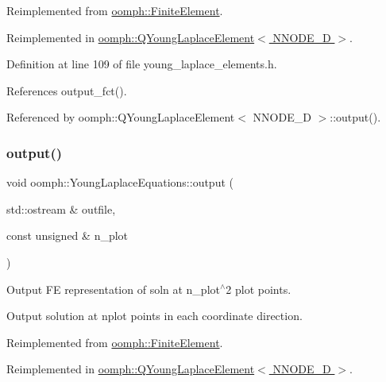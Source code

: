 Reimplemented from \hyperlink{classoomph_1_1FiniteElement_a2ad98a3d2ef4999f1bef62c0ff13f2a7}{oomph\+::\+Finite\+Element}.



Reimplemented in \hyperlink{classoomph_1_1QYoungLaplaceElement_acd3dd1655fe2b9fd060a15ab9116eeae}{oomph\+::\+Q\+Young\+Laplace\+Element$<$ N\+N\+O\+D\+E\+\_\+D $>$}.



Definition at line 109 of file young\+\_\+laplace\+\_\+elements.\+h.



References output\+\_\+fct().



Referenced by oomph\+::\+Q\+Young\+Laplace\+Element$<$ N\+N\+O\+D\+E\+\_\+D $>$\+::output().

\mbox{\label{classoomph_1_1YoungLaplaceEquations_a52b2a5e3e3292836861d612894b20a41}} 
\subsubsection{\texorpdfstring{output()}{output()}\hspace{0.1cm}{\footnotesize\ttfamily [2/2]}}
{\footnotesize\ttfamily void oomph\+::\+Young\+Laplace\+Equations\+::output (\begin{DoxyParamCaption}\item[{std\+::ostream \&}]{outfile,  }\item[{const unsigned \&}]{n\+\_\+plot }\end{DoxyParamCaption})\hspace{0.3cm}{\ttfamily [virtual]}}



Output FE representation of soln at n\+\_\+plot$^\wedge$2 plot points. 

Output solution at nplot points in each coordinate direction. 

Reimplemented from \hyperlink{classoomph_1_1FiniteElement_afa9d9b2670f999b43e6679c9dd28c457}{oomph\+::\+Finite\+Element}.



Reimplemented in \hyperlink{classoomph_1_1QYoungLaplaceElement_a4cbc12fd3e2e37de4985d00f6eed5a14}{oomph\+::\+Q\+Young\+Laplace\+Element$<$ N\+N\+O\+D\+E\+\_\+D $>$}.



